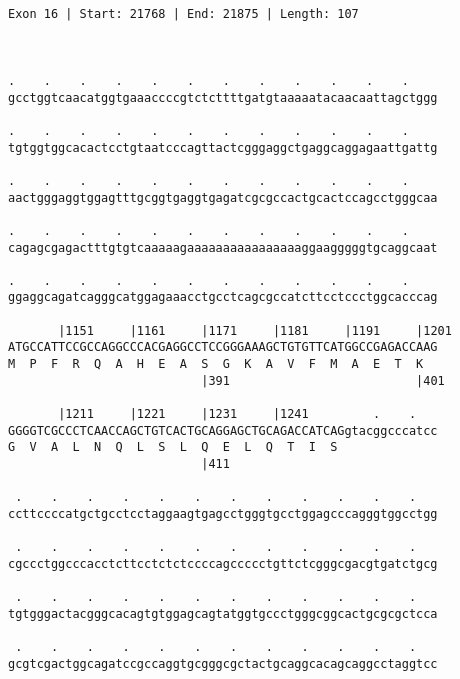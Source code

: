 \documentclass{article}
\begin{document}
\begin{Verbatim}
                     
 
Exon 16 | Start: 21768 | End: 21875 | Length: 107



.    .    .    .    .    .    .    .    .    .    .    .    
gcctggtcaacatggtgaaaccccgtctcttttgatgtaaaaatacaacaattagctggg
                                                            
.    .    .    .    .    .    .    .    .    .    .    .    
tgtggtggcacactcctgtaatcccagttactcgggaggctgaggcaggagaattgattg
                                                            
.    .    .    .    .    .    .    .    .    .    .    .    
aactgggaggtggagtttgcggtgaggtgagatcgcgccactgcactccagcctgggcaa
                                                            
.    .    .    .    .    .    .    .    .    .    .    .    
cagagcgagactttgtgtcaaaaagaaaaaaaaaaaaaaaaggaagggggtgcaggcaat
                                                            
.    .    .    .    .    .    .    .    .    .    .    .    
ggaggcagatcagggcatggagaaacctgcctcagcgccatcttcctccctggcacccag
                                                            
       |1151     |1161     |1171     |1181     |1191     |1201
ATGCCATTCCGCCAGGCCCACGAGGCCTCCGGGAAAGCTGTGTTCATGGCCGAGACCAAG
M  P  F  R  Q  A  H  E  A  S  G  K  A  V  F  M  A  E  T  K  
                           |391                          |401
  
       |1211     |1221     |1231     |1241         .    .   
GGGGTCGCCCTCAACCAGCTGTCACTGCAGGAGCTGCAGACCATCAGgtacggcccatcc
G  V  A  L  N  Q  L  S  L  Q  E  L  Q  T  I  S              
                           |411                             
  
 .    .    .    .    .    .    .    .    .    .    .    .   
ccttccccatgctgcctcctaggaagtgagcctgggtgcctggagcccagggtggcctgg
                                                            
 .    .    .    .    .    .    .    .    .    .    .    .   
cgccctggcccacctcttcctctctccccagccccctgttctcgggcgacgtgatctgcg
                                                            
 .    .    .    .    .    .    .    .    .    .    .    .   
tgtgggactacgggcacagtgtggagcagtatggtgccctgggcggcactgcgcgctcca
                                                            
 .    .    .    .    .    .    .    .    .    .    .    .   
gcgtcgactggcagatccgccaggtgcgggcgctactgcaggcacagcaggcctaggtcc
                                                            

\end{Verbatim}
\end{document}
